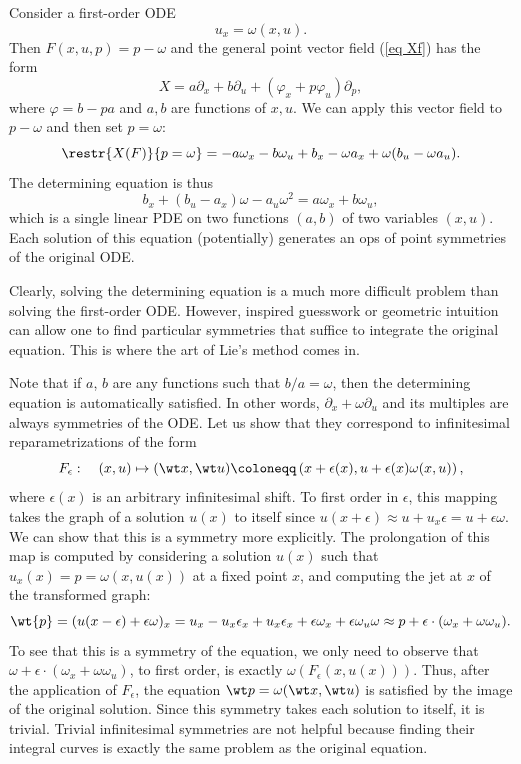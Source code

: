 \begin{example}
    Consider a first-order ODE 
    \[u_x=\omega(x,u).\]
    Then $F(x,u,p)=p-\omega$ and the general point vector field (\ref{eq Xf}) has the form 
    \[X=a\partial_x+b\partial_u+(\varphi_x+p\varphi_u)\partial_p,\]
    where $\varphi=b-pa$ and $a,b$ are functions of $x,u$. We can apply this vector field to $p-\omega$ and then set $p=\omega$:
    \[\restr{X(F)}{p=\omega}=-a\omega_x-b\omega_u+b_x-\omega a_x+\omega(b_u-\omega a_u).\]
    The determining equation is thus
    \[b_x+(b_u-a_x)\omega- a_u\omega^2=a\omega_x+b\omega_u,\]
    which is a single linear PDE on two functions $(a,b)$ of two variables $(x,u)$. Each solution of this equation (potentially) generates an \gls{ops} of point symmetries of the original ODE. 
    
    Clearly, solving the determining equation is a much more difficult problem than solving the first-order ODE. However, inspired guesswork or geometric intuition can allow one to find particular symmetries that suffice to integrate the original equation. This is where the art of Lie's method comes in.

    Note that if $a$, $b$ are any functions such that $b/a=\omega$, then the determining equation is automatically satisfied. In other words, $\partial_x+\omega\partial_u$ and its multiples are always symmetries of the ODE. Let us show that they correspond to infinitesimal reparametrizations of the form
    \[F_\epsilon:\quad (x,u)\mapsto (\wt x,\wt u)\coloneqq \left(x+\epsilon(x),u+\epsilon(x)\omega(x,u)\right),\]
    where $\epsilon(x)$ is an arbitrary infinitesimal shift. To first order in $\epsilon$, this mapping takes the graph of a solution $u(x)$ to itself since $u(x+\epsilon)\approx u+u_x\epsilon=u+\epsilon\omega$. We can show that this is a symmetry more explicitly. The prolongation of this map is computed by considering a solution $u(x)$ such that $u_x(x)=p=\omega(x,u(x))$ at a fixed point $x$, and computing the jet at $x$ of the transformed graph:
    \[\wt{p}=(u(x-\epsilon)+\epsilon\omega)_x=u_x-u_x\epsilon_x+u_x\epsilon_x+\epsilon\omega_x+\epsilon\omega_u\omega\approx p+\epsilon\cdot (\omega_x+\omega\omega_u).\]
    To see that this is a symmetry of the equation, we only need to observe that $\omega+\epsilon\cdot (\omega_x+\omega\omega_u)$, to first order, is exactly $\omega(F_\epsilon(x,u(x)))$. Thus, after the application of $F_\epsilon$, the equation $\wt p=\omega(\wt x,\wt u)$ is satisfied by the image of the original solution. Since this symmetry takes each solution to itself, it is trivial. Trivial infinitesimal symmetries are not helpful because finding their integral curves is exactly the same problem as the original equation.


\end{example}
